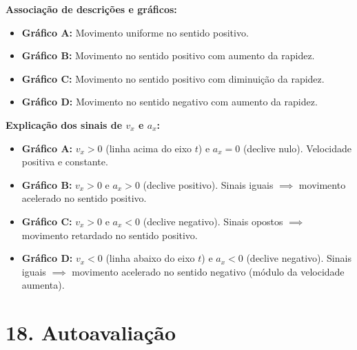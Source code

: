 \documentclass[11pt,a4paper]{article}
\begin{document}
	\begin{solucao}
		\textbf{Associação de descrições e gráficos:}
		\begin{itemize}
			\item \textbf{Gráfico A:} Movimento uniforme no sentido positivo.
			\item \textbf{Gráfico B:} Movimento no sentido positivo com aumento da rapidez.
			\item \textbf{Gráfico C:} Movimento no sentido positivo com diminuição da rapidez.
			\item \textbf{Gráfico D:} Movimento no sentido negativo com aumento da rapidez.
		\end{itemize}
		
		\textbf{Explicação dos sinais de $v_x$ e $a_x$:}
		\begin{itemize}
			\item \textbf{Gráfico A:} $v_x > 0$ (linha acima do eixo $t$) e $a_x = 0$ (declive nulo). Velocidade positiva e constante.
			\item \textbf{Gráfico B:} $v_x > 0$ e $a_x > 0$ (declive positivo). Sinais iguais $\implies$ movimento acelerado no sentido positivo.
			\item \textbf{Gráfico C:} $v_x > 0$ e $a_x < 0$ (declive negativo). Sinais opostos $\implies$ movimento retardado no sentido positivo.
			\item \textbf{Gráfico D:} $v_x < 0$ (linha abaixo do eixo $t$) e $a_x < 0$ (declive negativo). Sinais iguais $\implies$ movimento acelerado no sentido negativo (módulo da velocidade aumenta).
		\end{itemize}
	\end{solucao}
	
	\section*{18. Autoavaliação}
	
\end{document}
